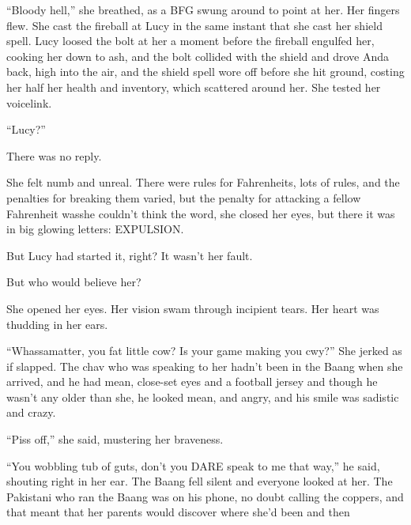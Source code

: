 “Bloody hell,” she breathed, as a BFG swung around to point at her.
Her fingers flew. She cast the fireball at Lucy in the same instant
that she cast her shield spell. Lucy loosed the bolt at her a
moment before the fireball engulfed her, cooking her down to ash,
and the bolt collided with the shield and drove Anda back, high
into the air, and the shield spell wore off before she hit ground,
costing her half her health and inventory, which scattered around
her. She tested her voicelink.

“Lucy?”

There was no reply.


She felt numb and unreal. There were rules for Fahrenheits, lots of
rules, and the penalties for breaking them varied, but the penalty
for attacking a fellow Fahrenheit was\dash{}she couldn’t think the word,
she closed her eyes, but there it was in big glowing letters:
EXPULSION.

But Lucy had started it, right? It wasn’t her fault.

But who would believe her?

She opened her eyes. Her vision swam through incipient tears. Her
heart was thudding in her ears.

“Whassamatter, you fat little cow? Is your game making you cwy?”
She jerked as if slapped. The chav who was speaking to her hadn’t
been in the Baang when she arrived, and he had mean, close-set eyes
and a football jersey and though he wasn’t any older than she, he
looked mean, and angry, and his smile was sadistic and crazy.

“Piss off,” she said, mustering her braveness.

“You wobbling tub of guts, don’t you DARE speak to me that way,” he
said, shouting right in her ear. The Baang fell silent and everyone
looked at her. The Pakistani who ran the Baang was on his phone, no
doubt calling the coppers, and that meant that her parents would
discover where she’d been and then\dash{}

